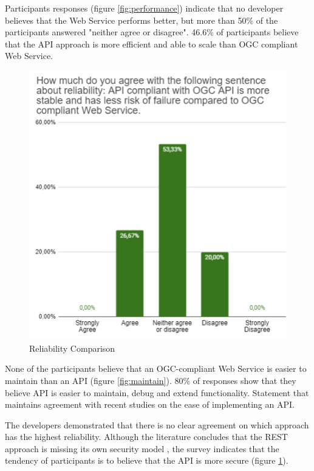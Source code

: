Participants responses (figure \ref{fig:performance}) indicate that no developer believes that the Web Service performs better, but more than 50\% of the participants answered "neither agree or disagree". 46.6\% of participants believe that the API approach is more efficient and able to scale than OGC compliant Web Service.


\begin{figure}[H]
     \centering
     \includegraphics[scale=0.8]{img/reliability.png}
     \caption{Reliability Comparison}
     \label{fig:reliability}
\end{figure}

None of the participants believe that an OGC-compliant Web Service is easier to maintain than an API (figure \ref{fig:maintain}). 80\% of responses show that they believe API is easier to maintain, debug and extend functionality. Statement that maintains agreement with recent studies on the ease of implementing an API.


The developers demonstrated that there is no clear agreement on which approach has the highest reliability. Although the literature concludes that the REST approach is missing its own security model \cite{tihomirovs2016comparison}, the survey indicates that the tendency of participants is to believe that the API is more secure (figure \ref{fig:reliability}).


